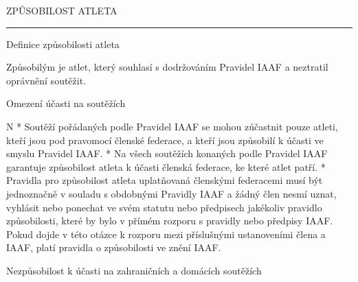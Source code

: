 \chap ZPŮSOBILOST ATLETA

\rule{19}
\secc Definice způsobilosti atleta

Způsobilým je atlet, který souhlasí s dodržováním Pravidel IAAF a neztratil oprávnění soutěžit.

\secc Omezení  účasti na soutěžích

\begitems \style N
* Soutěží pořádaných podle Pravidel IAAF se mohou zúčastnit pouze atleti, kteří jsou pod pravomocí členské federace, a kteří jsou způsobilí k účasti ve smyslu Pravidel IAAF.
* Na všech soutěžích konaných podle Pravidel IAAF garantuje způsobilost atleta k účasti členská federace, ke které atlet patří.
* Pravidla pro způsobilost atleta uplatňovaná členskými federacemi musí být jednoznačně v souladu s obdobnými Pravidly IAAF a žádný člen nesmí uznat, vyhlásit nebo ponechat ve svém statutu nebo předpisech jakékoliv pravidlo způsobilosti, které by bylo v přímém rozporu s pravidly nebo předpisy IAAF. Pokud dojde v této otázce k rozporu mezi příslušnými ustanoveními člena a IAAF, platí pravidla o způsobilosti ve znění IAAF.
\enditems

\secc Nezpůsobilost k účasti na zahraničních a domácích soutěžích

